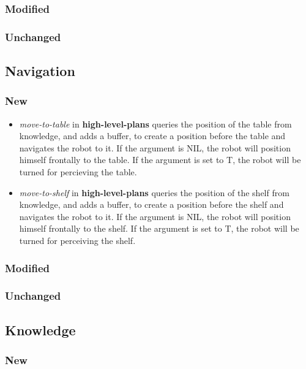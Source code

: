 \documentclass[main.tex]{subfiles}
\begin{document}
                \subsubsection{Modified}
                \subsubsection{Unchanged}
                
                \subsection{Navigation}
                \subsubsection{New}
                  \begin{itemize}
                    \item \textit{move-to-table} in \textbf{high-level-plans} queries the position of the table from knowledge, and adds a buffer, to create a position before the table and navigates the robot to it. If the argument is NIL, the robot will position himself frontally to the table. If the argument is set to T, the robot will be turned for percieving the table.
                    \item \textit{move-to-shelf} in \textbf{high-level-plans} queries the position of the shelf from knowledge, and adds a buffer, to create a position before the shelf and navigates the robot to it. If the argument is NIL, the robot will position himself frontally to the shelf. If the argument is set to T, the robot will be turned for perceiving the shelf.
                  \end{itemize}
                \subsubsection{Modified}
                \subsubsection{Unchanged}
                
                \subsection{Knowledge}
                \subsubsection{New}
\end{document}
